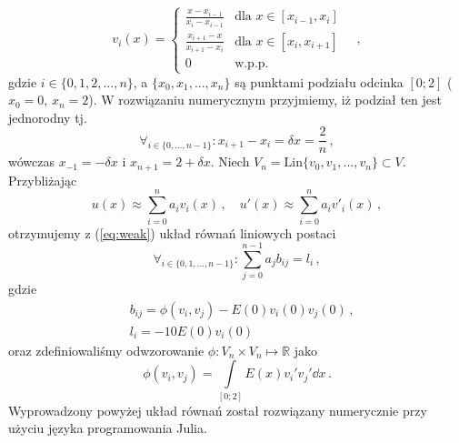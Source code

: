 \documentclass{myclass}
\begin{document}
\begin{equation}
    v_i(x) = \begin{cases}
        \frac{x-x_{i-1}}{x_i - x_{i-1}}&\text{dla \(x\in [x_{i-1},x_i]\)}\\
        \frac{x_{i+1}-x}{x_{i+1} - x_{i}}&\text{dla \(x\in [x_{i},x_{i+1}]\)}\\
        0&\text{w.p.p.}
    \end{cases}\quad,
\end{equation}
gdzie \(i\in\{0,1,2,...,n\}\), a \(\{x_0,x_1,...,x_n\}\) są punktami podziału
odcinka \([0;2]\) (\(x_0=0\), \(x_n=2\)). W rozwiązaniu numerycznym przyjmiemy,
iż podział ten jest jednorodny tj. 
\begin{equation}
    \forall_{i\in\{0,...,n-1\}}: x_{i+1}-x_{i} = \delta x = \frac{2}{n}\,,
\end{equation}
wówczas \(x_{-1}=-\delta x\) i \(x_{n+1}=2+\delta x\). Niech
\(V_n=\text{Lin}\{v_0,v_1,...,v_n\} \subset V\). Przybliżając
\begin{equation}
    u(x)\approx \sum_{i=0}^na_iv_i(x)\,,\quad u'(x)\approx \sum_{i=0}^na_iv'_i(x)\,,
\end{equation}
otrzymujemy z (\ref{eq:weak}) układ równań liniowych postaci
\begin{equation}
    \forall_{i\in\{0,1,...,n-1\}}: \sum_{j=0}^{n-1} a_jb_{ij} = l_i\,,
\end{equation}
gdzie 
\begin{equation}
    \begin{split}
        &b_{ij} = \phi(v_i,v_j)-E(0)v_i(0)v_j(0)\,,\\
        &l_i =-10E(0)v_i(0)
    \end{split}
\end{equation}
oraz zdefiniowaliśmy odwzorowanie \(\phi:V_n\times V_n\mapsto\mathbb{R}\) jako
\begin{equation}
    \phi(v_i,v_j)=\int\limits_{[0;2]}E(x)v_i'v_j'\dd{x}\,.
\end{equation}
Wyprowadzony powyżej układ równań został rozwiązany numerycznie przy użyciu
języka programowania Julia.
\end{document}
